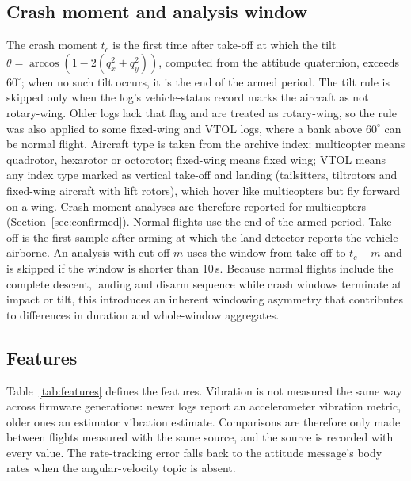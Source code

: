 \documentclass[preprint,12pt]{elsarticle}
\begin{document}
\subsection{Crash moment and analysis window}
\label{sec:crashwindow}
The crash moment $t_c$ is the first time after take-off at which the tilt
$\theta=\arccos\left(1-2(q_x^2+q_y^2)\right)$, computed from the attitude quaternion, exceeds $60^\circ$; when no such
tilt occurs, it is the end of the armed period. The tilt rule is skipped only when the log's vehicle-status record
marks the aircraft as not rotary-wing. Older logs lack that flag and are treated as rotary-wing, so the rule was also
applied to some fixed-wing and VTOL logs, where a bank above $60^\circ$ can be normal flight. Aircraft type is taken
from the archive index: multicopter means quadrotor, hexarotor or octorotor; fixed-wing means fixed wing; VTOL means
any index type marked as vertical take-off and landing (tailsitters, tiltrotors and fixed-wing aircraft with lift
rotors), which hover like multicopters but fly forward on a wing. Crash-moment analyses are therefore
reported for multicopters (Section~\ref{sec:confirmed}). Normal flights use the end of the armed
period. Take-off is the first sample after arming at which the land detector reports the vehicle airborne. An analysis
with cut-off $m$ uses the window from take-off to $t_c-m$ and is skipped if the window is shorter than 10\,s. Because
normal flights include the complete descent, landing and disarm sequence while crash windows terminate at impact or
tilt, this introduces an inherent windowing asymmetry that contributes to differences in duration and whole-window
aggregates.

\subsection{Features}
Table~\ref{tab:features} defines the features. Vibration is not measured the same way across firmware generations:
newer logs report an accelerometer vibration metric, older ones an estimator vibration estimate. Comparisons are
therefore only made between flights measured with the same source, and the source is recorded with every value. The
rate-tracking error falls back to the attitude message's body rates when the angular-velocity topic is absent.
\end{document}
